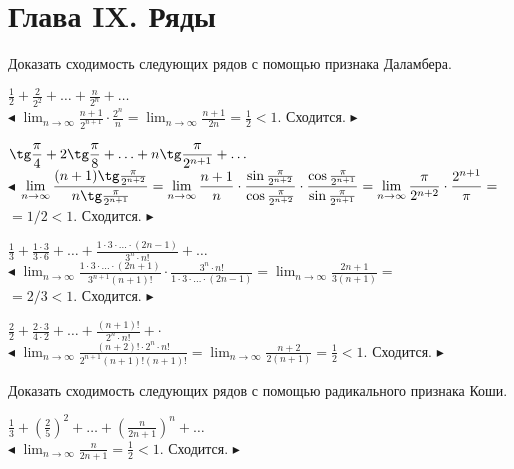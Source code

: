 \documentclass[a5paper,10pt]{article}
\begin{document}

\bigskip
\section* {Глава IX. Ряды}

\medskip
\noindent Доказать сходимость следующих рядов с помощью признака Даламбера. 

\medskip
{} $\displaystyle\frac{1}{2}+\frac{2}{2^2}+\ldots+\frac{n}{2^n}+\ldots$\\
$\blacktriangleleft$ $\displaystyle\lim_{n\to\infty}\frac{n+1}{2^{n+1}}\cdot\frac{2^n}{n}=
\lim_{n\to\infty}\frac{n+1}{2n}=\frac12<1$. Сходится. $\blacktriangleright$

\medskip
{} $\displaystyle\tg\frac{\pi}{4}+2\tg\frac{\pi}{8}+
\ldots+n\tg\frac{\pi}{2^{n+1}}+\ldots$\\
$\blacktriangleleft$ $\displaystyle\lim_{n\to\infty}
\frac{(n+1)\tg\frac{\pi}{2^{n+2}}}{n\tg\frac{\pi}{2^{n+1}}}=
\lim_{n\to\infty}\frac{n+1}{n}\cdot
\frac{\sin\frac{\pi}{2^{n+2}}}{\cos\frac{\pi}{2^{n+2}}}\cdot
\frac{\cos\frac{\pi}{2^{n+1}}}{\sin\frac{\pi}{2^{n+1}}}=
\lim_{n\to\infty}\frac{\pi}{2^{n+2}}\cdot\frac{2^{n+1}}{\pi}=$\\
$\displaystyle =1/2<1$.
Сходится. $\blacktriangleright$

\medskip
{} $\displaystyle\frac{1}{3}+\frac{1\cdot 3}{3\cdot 6}+
\ldots+\frac{1\cdot3\cdot\ldots\cdot(2n-1)}{3^n\cdot n!}+\ldots$\\
$\blacktriangleleft$ $\displaystyle\lim_{n\to\infty}
\frac{1\cdot3\cdot\ldots\cdot(2n+1)}{3^{n+1}(n+1)!}\cdot
\frac{3^n\cdot n!}{1\cdot3\cdot\ldots\cdot(2n-1)}=
\lim_{n\to\infty}\frac{2n+1}{3(n+1)}=$\\
$\displaystyle =2/3<1$. Сходится. $\blacktriangleright$

\medskip
{} $\displaystyle\frac22+\frac{2\cdot3}{4\cdot 2}+\ldots+
\frac{(n+1)!}{2^n\cdot n!}+\cdot$\\
$\blacktriangleleft$ $\displaystyle\lim_{n\to\infty}\frac{(n+2)!\cdot2^n\cdot n!}
{2^{n+1}(n+1)!(n+1)!}=\lim_{n\to\infty}\frac{n+2}{2(n+1)}=\frac12<1$. Сходится.
$\blacktriangleright$

\medskip
\noindent Доказать сходимость следующих рядов с помощью радикального признака Коши.

\medskip
{} $\displaystyle\frac13+\left(\frac25\right)^2+\dots
+\left(\frac{n}{2n+1}\right)^n+\ldots$\\
$\blacktriangleleft$ $\displaystyle\lim_{n\to\infty}\frac{n}{2n+1}=\frac12<1$.
Сходится. $\blacktriangleright$
\end{document}
